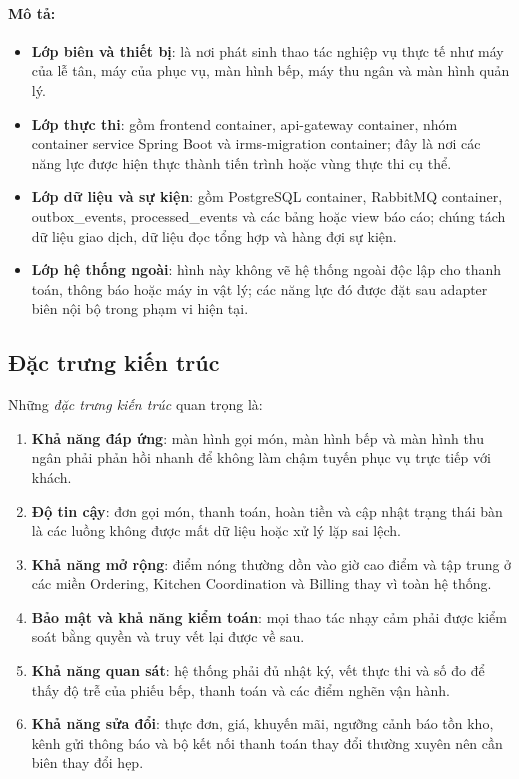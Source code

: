 \paragraph{Mô tả:}
\begin{itemize}
  \item \textbf{Lớp biên và thiết bị}: là nơi phát sinh thao tác nghiệp vụ thực tế như máy của lễ tân, máy của phục vụ, màn hình bếp, máy thu ngân và màn hình quản lý.
  \item \textbf{Lớp thực thi}: gồm \textsf{frontend container}, \textsf{api-gateway container}, nhóm container service Spring Boot và \textsf{irms-migration container}; đây là nơi các năng lực được hiện thực thành tiến trình hoặc vùng thực thi cụ thể.
  \item \textbf{Lớp dữ liệu và sự kiện}: gồm \textsf{PostgreSQL container}, \textsf{RabbitMQ container}, \textsf{outbox\_events}, \textsf{processed\_events} và các bảng hoặc view báo cáo; chúng tách dữ liệu giao dịch, dữ liệu đọc tổng hợp và hàng đợi sự kiện.
  \item \textbf{Lớp hệ thống ngoài}: hình này không vẽ hệ thống ngoài độc lập cho thanh toán, thông báo hoặc máy in vật lý; các năng lực đó được đặt sau adapter biên nội bộ trong phạm vi hiện tại.
\end{itemize}


\subsection{Đặc trưng kiến trúc}
Những \emph{đặc trưng kiến trúc} quan trọng là:
\begin{enumerate}
  \item \textbf{Khả năng đáp ứng}: màn hình gọi món, màn hình bếp và màn hình thu ngân phải phản hồi nhanh để không làm chậm tuyến phục vụ trực tiếp với khách.
  \item \textbf{Độ tin cậy}: đơn gọi món, thanh toán, hoàn tiền và cập nhật trạng thái bàn là các luồng không được mất dữ liệu hoặc xử lý lặp sai lệch.
  \item \textbf{Khả năng mở rộng}: điểm nóng thường dồn vào giờ cao điểm và tập trung ở các miền \textsf{Ordering}, \textsf{Kitchen Coordination} và \textsf{Billing} thay vì toàn hệ thống.
  \item \textbf{Bảo mật và khả năng kiểm toán}: mọi thao tác nhạy cảm phải được kiểm soát bằng quyền và truy vết lại được về sau.
  \item \textbf{Khả năng quan sát}: hệ thống phải đủ nhật ký, vết thực thi và số đo để thấy độ trễ của phiếu bếp, thanh toán và các điểm nghẽn vận hành.
  \item \textbf{Khả năng sửa đổi}: thực đơn, giá, khuyến mãi, ngưỡng cảnh báo tồn kho, kênh gửi thông báo và bộ kết nối thanh toán thay đổi thường xuyên nên cần biên thay đổi hẹp.
\end{enumerate}

